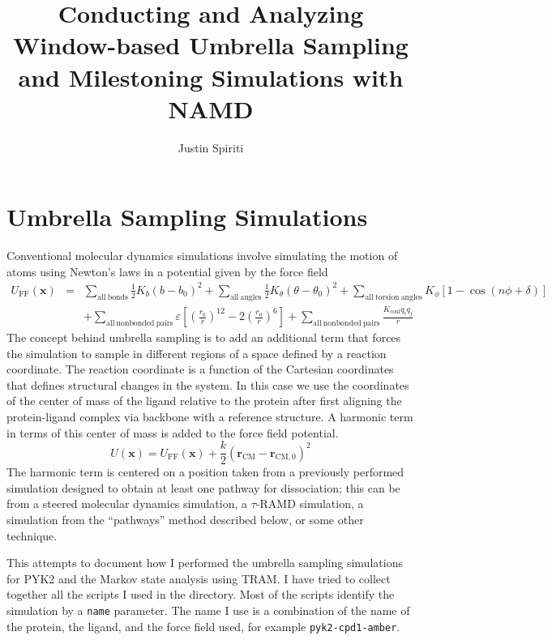\documentclass{article}      %
\title{Conducting and Analyzing Window-based Umbrella Sampling and Milestoning Simulations with NAMD}  %
\author{Justin Spiriti}      %
\begin{document}

\maketitle                   %



\section{Umbrella Sampling Simulations}



Conventional molecular dynamics simulations involve simulating the motion of atoms using Newton's laws in a potential given by the force field
\begin{eqnarray}
U_\mathrm{FF}(\mathbf{x}) &=& \sum_\mathrm{all\ bonds} \frac{1}{2} K_b\left(b-b_0\right)^2  + \sum_\mathrm{all\  angles} \frac{1}{2} K_\theta\left(\theta-\theta_0\right)^2 + \sum_\mathrm{all\ torsion\ angles} K_\phi\left[1-\cos\left(n\phi+\delta\right)\right] \nonumber \\
& &  +  \sum_\mathrm{all\ nonbonded\ pairs} \varepsilon \left[\left(\frac{r_0}{r}\right)^{12} - 2 \left(\frac{r_0}{r}\right)^6 \right] +  \sum_\mathrm{all\ nonbonded\ pairs} \frac{K_\mathrm{coul} q_i q_j}{r}
\end{eqnarray} 
The concept behind umbrella sampling is to add an additional term that forces the simulation to sample in different regions of a space defined by a reaction coordinate.  The reaction coordinate is a function of the Cartesian coordinates that defines structural changes in the system.  In this case we use the coordinates of the center of mass of the ligand relative to the protein after first aligning the protein-ligand complex via backbone with a reference structure.   A harmonic term in terms of this center of mass is added to the force field potential.
\begin{equation}
U(\mathbf{x}) = U_\mathrm{FF}(\mathbf{x}) + \frac{k}{2}\left(\mathbf{r}_\mathrm{CM}-\mathbf{r}_\mathrm{CM,0}\right)^2
\end{equation}
The harmonic term is centered on a position taken from a previously performed simulation designed to obtain at least one pathway for dissociation; this can be from a steered molecular dynamics simulation, a $\tau$-RAMD simulation, a simulation from the ``pathways'' method described below, or some other technique.  


This attempts to document how I performed the umbrella sampling simulations for PYK2 and the Markov state analysis using TRAM.  I have tried to collect together all the scripts I used in the \verb++ directory.  Most of the scripts identify the simulation by a \verb+name+ parameter.  The name I use is a combination of the name of the protein, the ligand, and the force field used, for example \verb+pyk2-cpd1-amber+.   
\end{document}
